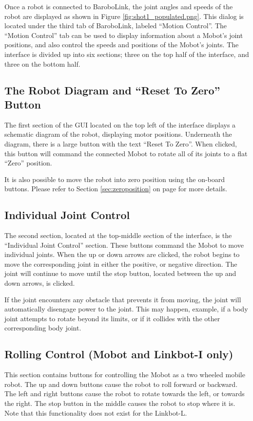 \documentclass{article}
\begin{document}
Once a robot is connected to BaroboLink, the joint angles and speeds
of the robot are displayed as shown in Figure \ref{fig:shot1_populated.png}.
This dialog is located under the third tab of BaroboLink, labeled 
``Motion Control''.
The ``Motion Control'' tab can be
used to display
information about a Mobot's joint positions, and also control the
speeds and positions of the Mobot's joints. The interface is divided
up into six sections; three on the top half of the interface, and three on 
the bottom half. 

\subsection{The Robot Diagram and ``Reset To Zero'' Button}
The first section of the GUI located on the top left of the interface
displays a schematic diagram of the robot, displaying motor positions.
Underneath the diagram, there is a large button with the text 
``Reset To Zero''. When clicked, this button will command the connected
Mobot to rotate all of its joints to a flat ``Zero'' position.

It is also possible to move the robot into zero position using the
on-board buttons. Please refer to Section \ref{sec:zeroposition} on
page \pageref{sec:zeroposition} for more details.

\subsection{Individual Joint Control}
The second section, located at the top-middle section of the interface,
is the ``Individual Joint Control'' section. These buttons command the
Mobot to move individual joints. When the up or down arrows are clicked,
the robot begins to move the corresponding joint in either the positive,
or negative direction. The joint will continue to move until the stop 
button, located between the up and down arrows, is clicked. 

If the joint encounters any obstacle that prevents it from moving, the 
joint will automatically disengage power to the joint. This may happen, 
example, if a body joint attempts to rotate beyond its limits,
or if it collides with the other corresponding body joint. 

\subsection{Rolling Control (Mobot and Linkbot-I only)}
This section contains buttons for controlling the Mobot as a 
two wheeled mobile robot. The up and down buttons cause the robot to
roll forward or backward. The left and right buttons cause the robot 
to rotate towards the left, or towards the right. The stop button in the
middle causes the robot to stop where it is. Note that this functionality
does not exist for the Linkbot-L.
\end{document}
